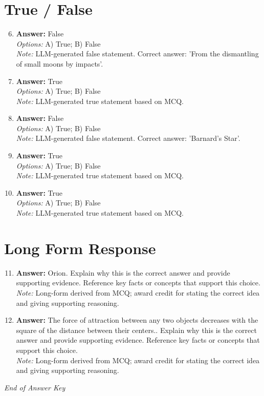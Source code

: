 \documentclass[12pt]{article}
\begin{document}
\section*{True / False}
\begin{enumerate}[label=\arabic*.]
\setcounter{enumi}{5}
\item \textbf{Answer:} False
\\ \textit{Options:} A) True; B) False
\\ \textit{Note:} LLM-generated false statement. Correct answer: 'From the dismantling of small moons by impacts'.
\item \textbf{Answer:} True
\\ \textit{Options:} A) True; B) False
\\ \textit{Note:} LLM-generated true statement based on MCQ.
\item \textbf{Answer:} False
\\ \textit{Options:} A) True; B) False
\\ \textit{Note:} LLM-generated false statement. Correct answer: 'Barnard's Star'.
\item \textbf{Answer:} True
\\ \textit{Options:} A) True; B) False
\\ \textit{Note:} LLM-generated true statement based on MCQ.
\item \textbf{Answer:} True
\\ \textit{Options:} A) True; B) False
\\ \textit{Note:} LLM-generated true statement based on MCQ.
\end{enumerate}

\section*{Long Form Response}
\begin{enumerate}[label=\arabic*.]
\setcounter{enumi}{10}
\item \textbf{Answer:} Orion. Explain why this is the correct answer and provide supporting evidence. Reference key facts or concepts that support this choice.
\\ \textit{Note:} Long-form derived from MCQ; award credit for stating the correct idea and giving supporting reasoning.
\item \textbf{Answer:} The force of attraction between any two objects decreases with the square of the distance between their centers.. Explain why this is the correct answer and provide supporting evidence. Reference key facts or concepts that support this choice.
\\ \textit{Note:} Long-form derived from MCQ; award credit for stating the correct idea and giving supporting reasoning.
\end{enumerate}

\vfill
\noindent\textit{End of Answer Key}
\end{document}
